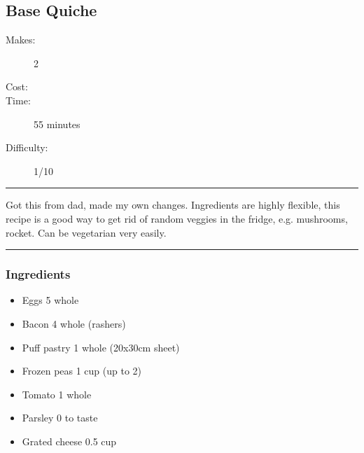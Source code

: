 \documentclass[]{article}
\begin{document}
\subsection*{\center\huge Base Quiche}
\begin{description}
\item[Makes:] 2 
\item[Cost:] \textdollar
\item[Time:] 55 minutes
\item[Difficulty:] 1/10
\end{description}
\vspace{0.2cm}\hrule\vspace{0.5cm}
\begin{adjustwidth}{0.5 cm}{0.5 cm}

Got this from dad, made my own changes. Ingredients are highly flexible, this recipe is a good way to get rid of random veggies in the fridge, e.g. mushrooms, rocket. Can be vegetarian very easily. \hfill\color{accent}{\Large\faHeart\hspace{0.1cm}}\color{black}

\end{adjustwidth}
\vspace{0.5cm}\hrule
\subsubsection*{\Large Ingredients}
\begin{multicols}{2}
\begin{itemize}
 \item Eggs \hfill 5 whole
 \item Bacon \hfill 4 whole (rashers)
 \item Puff pastry \hfill 1 whole (20x30cm sheet)
 \item Frozen peas \hfill 1 cup (up to 2)
 \item Tomato \hfill 1 whole
 \item Parsley \hfill 0 to taste
 \item Grated cheese \hfill 0.5 cup
\end{itemize}
\end{multicols}
\end{document}
